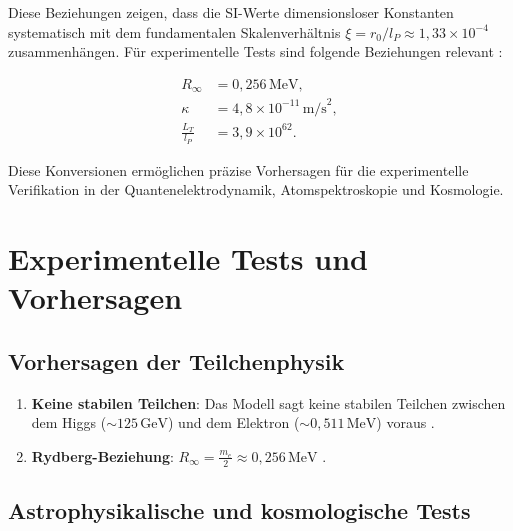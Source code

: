 \documentclass[twocolumn,aps,prl]{revtex4-2}
\begin{document}
{{{{{{{{{{{{{{{																	Diese Beziehungen zeigen, dass die SI-Werte dimensionsloser Konstanten systematisch mit dem fundamentalen Skalenverhältnis \(\xi = r_0/l_P \approx 1{,}33 \times 10^{-4}\) zusammenhängen. Für experimentelle Tests sind folgende Beziehungen relevant \cite{pascher_alpha_2025}:
																	
																	\begin{align}
																		R_{\infty} &= 0{,}256 \, \text{MeV}, \label{eq:rydberg} \\
																		\kappa &= 4{,}8 \times 10^{-11} \, \text{m/s}^2, \label{eq:kappa} \\
																		\frac{L_T}{l_P} &= 3{,}9 \times 10^{62}. \label{eq:lt_to_lp}
																	\end{align}
																	
																	Diese Konversionen ermöglichen präzise Vorhersagen für die experimentelle Verifikation in der Quantenelektrodynamik, Atomspektroskopie und Kosmologie.
																	
																	\section{Experimentelle Tests und Vorhersagen}
																	\label{sec:outlook}
																	
																	\subsection{Vorhersagen der Teilchenphysik}
																	\label{subsec:particle_predictions}
																	
																	\begin{enumerate}
																		\item \textbf{Keine stabilen Teilchen}: Das Modell sagt keine stabilen Teilchen zwischen dem Higgs (\(\sim 125 \, \text{GeV}\)) und dem Elektron (\(\sim 0{,}511 \, \text{MeV}\)) voraus \cite{ATLAS2012, CMS2012, Ellis1976}.
																		\item \textbf{Rydberg-Beziehung}: \(R_\infty = \frac{m_e}{2} \approx 0{,}256 \, \text{MeV}\) \cite{Hansch2006, Udem2002}.
																	\end{enumerate}
																	
																	\subsection{Astrophysikalische und kosmologische Tests}
																	\label{subsec:astro_tests}
																	
}}}}}}}}}}}}}}}
\end{document}
